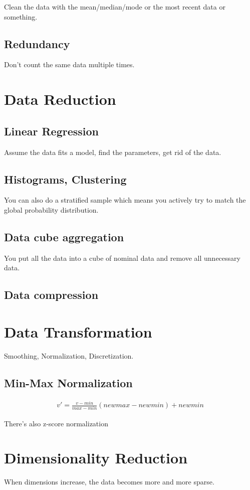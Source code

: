 \documentclass[fleqn]{report}
\newcommand{\equations} [1] {
\begin{gather*}
#1
\end{gather*}
}
\begin{document}
Clean the data with the mean/median/mode or the most recent data or something.

\subsection{Redundancy}
Don't count the same data multiple times. 

\section{Data Reduction}
\subsection{Linear Regression}
Assume the data fits a model, find the parameters, get rid of the data. 
\subsection{Histograms, Clustering}
You can also do a stratified sample which means you actively try to match 
the global probability distribution.
\subsection{Data cube aggregation}
You put all the data into a cube of nominal data and remove all unnecessary 
data. 
\subsection{Data compression}

\section{Data Transformation}
Smoothing, Normalization, Discretization.

\subsection{Min-Max Normalization}
\equations{
    v' 
    =
    \frac{v - min}{max - min}(newmax - newmin) + newmin
}

There's also z-score normalization

\section{Dimensionality Reduction}
When dimensions increase, the data becomes more and more sparse. 
\end{document}
